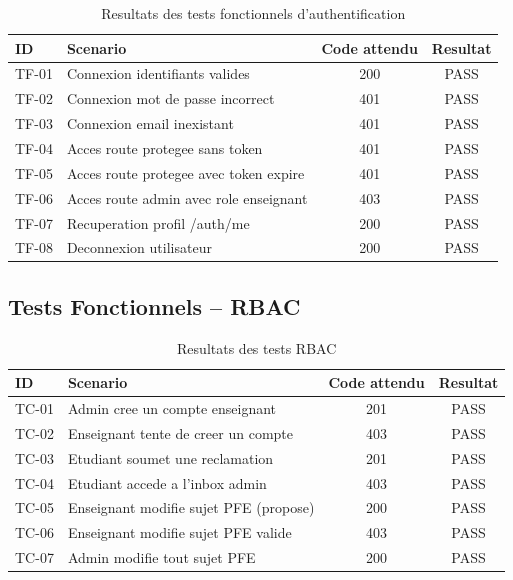 \documentclass[12pt,a4paper]{report}
\begin{document}
\begin{table}[H]
\centering
\caption{Resultats des tests fonctionnels d'authentification}
\begin{tabular}{lp{6cm}cc}
\toprule
\textbf{ID} & \textbf{Scenario} & \textbf{Code attendu} & \textbf{Resultat} \\
\midrule
TF-01 & Connexion identifiants valides         & 200 & PASS \\
TF-02 & Connexion mot de passe incorrect       & 401 & PASS \\
TF-03 & Connexion email inexistant             & 401 & PASS \\
TF-04 & Acces route protegee sans token        & 401 & PASS \\
TF-05 & Acces route protegee avec token expire & 401 & PASS \\
TF-06 & Acces route admin avec role enseignant & 403 & PASS \\
TF-07 & Recuperation profil /auth/me           & 200 & PASS \\
TF-08 & Deconnexion utilisateur                & 200 & PASS \\
\bottomrule
\end{tabular}
\end{table}

\subsection{Tests Fonctionnels -- RBAC}

\begin{table}[H]
\centering
\caption{Resultats des tests RBAC}
\begin{tabular}{lp{6cm}cc}
\toprule
\textbf{ID} & \textbf{Scenario} & \textbf{Code attendu} & \textbf{Resultat} \\
\midrule
TC-01 & Admin cree un compte enseignant         & 201 & PASS \\
TC-02 & Enseignant tente de creer un compte     & 403 & PASS \\
TC-03 & Etudiant soumet une reclamation         & 201 & PASS \\
TC-04 & Etudiant accede a l'inbox admin         & 403 & PASS \\
TC-05 & Enseignant modifie sujet PFE (propose)  & 200 & PASS \\
TC-06 & Enseignant modifie sujet PFE valide     & 403 & PASS \\
TC-07 & Admin modifie tout sujet PFE            & 200 & PASS \\
\bottomrule
\end{tabular}
\end{table}
\end{document}
